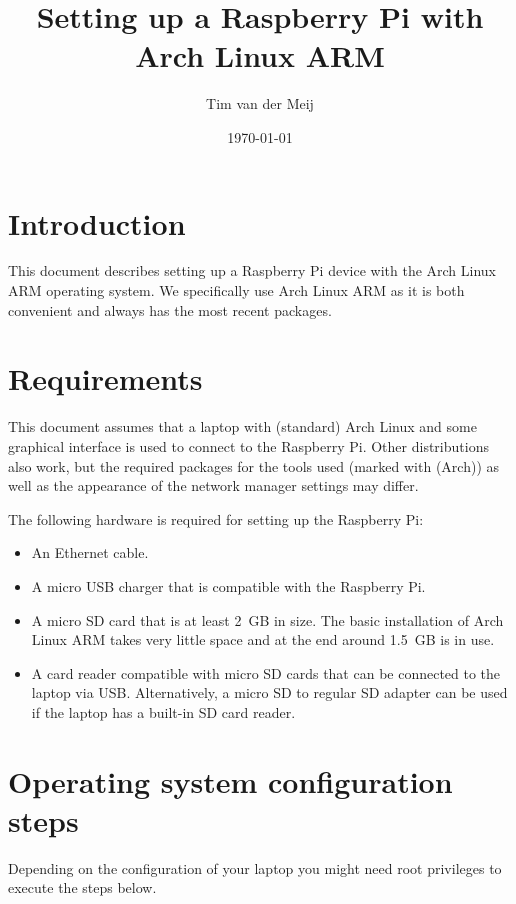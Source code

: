 \documentclass{article}
\newcommand{\arch}{{\color{red} (Arch)}}
\begin{document}
\title{Setting up a Raspberry Pi with Arch Linux ARM}
\author{Tim van der Meij}
\date{\today}

\maketitle

\section{Introduction}
This document describes setting up a Raspberry Pi device with the Arch Linux ARM
operating system. We specifically use Arch Linux ARM as it is both convenient 
and always has the most recent packages.

\section{Requirements}
This document assumes that a laptop with (standard) Arch Linux and some 
graphical interface is used to connect to the Raspberry Pi. Other distributions 
also work, but the required packages for the tools used (marked with \arch{}) 
as well as the appearance of the network manager settings may differ.

The following hardware is required for setting up the Raspberry Pi:

\begin{itemize}
    \item An Ethernet cable.
    \item A micro USB charger that is compatible with the Raspberry Pi.
    \item A micro SD card that is at least 2~GB in size. The basic installation 
          of Arch Linux ARM takes very little space and at the end around
          1.5~GB is in use.
    \item A card reader compatible with micro SD cards that can be connected to 
          the laptop via USB\@. Alternatively, a micro SD to regular SD adapter 
          can be used if the laptop has a built-in SD card reader.
\end{itemize}

\section{Operating system configuration steps}
Depending on the configuration of your laptop you might need root privileges to 
execute the steps below.
\end{document}
